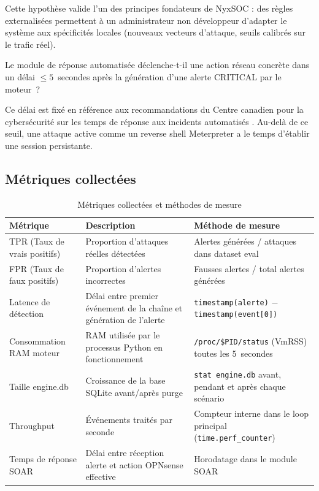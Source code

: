 \documentclass[12pt,a4paper]{article}
\begin{document}
\begin{description}
    Cette hypothèse valide l'un des principes fondateurs de
    NyxSOC : des règles externalisées permettent à un
    administrateur non développeur d'adapter le système aux
    spécificités locales (nouveaux vecteurs d'attaque, seuils
    calibrés sur le trafic réel).

    \item[H4 --- Réactivité de la réponse automatisée]
    Le module de réponse automatisée déclenche-t-il une action
    réseau concrète dans un délai $\leq 5$~secondes après la
    génération d'une alerte CRITICAL par le moteur~?

    Ce délai est fixé en référence aux recommandations du Centre
    canadien pour la cybersécurité sur les temps de réponse aux
    incidents automatisés \cite{cccs_siem}. Au-delà de ce seuil,
    une attaque active comme un reverse shell Meterpreter a le
    temps d'établir une session persistante.
\end{description}

\subsection{Métriques collectées}

\begin{table}[H]
\centering
\caption{Métriques collectées et méthodes de mesure}
\label{tab:metrics}
\begin{tabularx}{\textwidth}{|l|X|X|}
\hline
\textbf{Métrique} & \textbf{Description} & \textbf{Méthode de mesure} \\
\hline
TPR (Taux de vrais positifs)
  & Proportion d'attaques réelles détectées
  & Alertes générées / attaques dans dataset eval \\
FPR (Taux de faux positifs)
  & Proportion d'alertes incorrectes
  & Fausses alertes / total alertes générées \\
Latence de détection
  & Délai entre premier événement de la chaîne et génération de l'alerte
  & \texttt{timestamp(alerte)} $-$ \texttt{timestamp(event[0])} \\
Consommation RAM moteur
  & RAM utilisée par le processus Python en fonctionnement
  & \texttt{/proc/\$PID/status} (VmRSS) toutes les 5~secondes \\
Taille engine.db
  & Croissance de la base SQLite avant/après purge
  & \texttt{stat engine.db} avant, pendant et après chaque scénario \\
Throughput
  & Événements traités par seconde
  & Compteur interne dans le loop principal (\texttt{time.perf\_counter}) \\
Temps de réponse SOAR
  & Délai entre réception alerte et action OPNsense effective
  & Horodatage dans le module SOAR \\
\hline
\end{tabularx}
\end{table}
\end{document}
